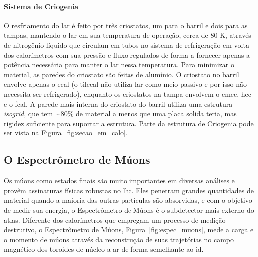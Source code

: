 \paragraph{Sistema de Criogenia}
\label{par:cal_criogenia}

O resfriamento do \gls{lar} é feito por três criostatos, 
um para o barril e dois para as tampas, mantendo o \gls{lar} em sua temperatura
de operação, cerca de 80 K, através de nitrogênio líquido que circulam em tubos
no sistema de refrigeração em volta dos calorímetros com sua pressão e fluxo
regulados de forma a fornecer apenas a potência necessária para manter o
\gls{lar} nessa temperatura. Para minimizar o material, as paredes do criostato
são feitas de alumínio. O criostato no barril envolve apenas o
\gls{ecal} (o \gls{tilecal} não utiliza \gls{lar} como meio passivo e por
isso não necessita ser refrigerado), enquanto os criostatos na tampa envolvem o \gls{emec},
\gls{hec} e o \gls{fcal}. A parede mais interna do criostato do
barril utiliza uma estrutura \emph{isogrid}, que tem $\sim80\%$ de material a
menos que uma placa solida teria, mas rigidez suficiente para suportar a
estrutura. Parte da estrutura de Criogenia pode ser vista na
Figura~\ref{fig:secao_em_calo}.


\subsection{O Espectrômetro de Múons}
\label{ssec:espectometro_muons}


Os múons como estados finais são muito importantes em diversas análises e provêm
assinaturas físicas robustas no \gls{lhc}. 
Eles penetram grandes quantidades de material quando a maioria das outras
partículas são absorvidas, e com o objetivo de medir sua energia, o Espectrômetro
de Múons \cite{muon_tdr} é o subdetector mais externo do \gls{atlas}. Diferente dos calorímetros
que empregam um processo de medição destrutivo, o Espectrômetro de Múons,
Figura~\ref{fig:espec_muons}, mede a carga e o momento de múons através 
da reconstrução de suas trajetórias no 
campo magnético dos toroides de núcleo a ar de forma semelhante ao \gls{id}. 

